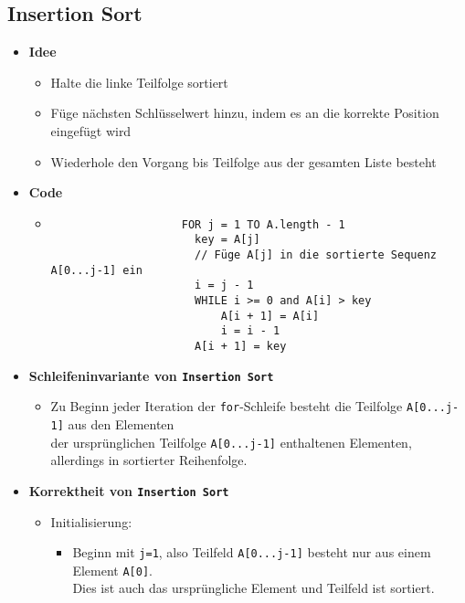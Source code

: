 \subsection{Insertion Sort}
    \begin{itemize}
        \item \textbf{Idee}
            \begin{itemize}
                \item Halte die linke Teilfolge sortiert
                \item Füge nächsten Schlüsselwert hinzu, indem es an die korrekte Position eingefügt wird
                \item Wiederhole den Vorgang bis Teilfolge aus der gesamten Liste besteht
            \end{itemize}
        
        \item \textbf{Code}
            \begin{itemize}
                \item[]
                 \begin{verbatim}  
                    FOR j = 1 TO A.length - 1
                      key = A[j]
                      // Füge A[j] in die sortierte Sequenz A[0...j-1] ein
                      i = j - 1
                      WHILE i >= 0 and A[i] > key
                          A[i + 1] = A[i]
                          i = i - 1
                      A[i + 1] = key
                    \end{verbatim}
            \end{itemize}
            
        \item \textbf{Schleifeninvariante von \texttt{Insertion Sort}} {\label{insSortSiv}} 
            \begin{itemize}
                \item Zu Beginn jeder Iteration der \texttt{for}-Schleife besteht die Teilfolge \texttt{A[0...j-1]} aus den Elementen \\
                der ursprünglichen Teilfolge \texttt{A[0...j-1]} enthaltenen Elementen, allerdings in sortierter Reihenfolge.
            \end{itemize}

        \item \textbf{Korrektheit von \texttt{Insertion Sort}}
            \begin{itemize}
                \item Initialisierung:
                    \begin{itemize}
                        \item   Beginn mit \texttt{j=1}, also Teilfeld \texttt{A[0...j-1]} besteht nur aus einem Element \texttt{A[0]}. \\
                                Dies ist auch das ursprüngliche Element und Teilfeld ist sortiert.
                    \end{itemize}


\end{itemize}
\end{itemize}
